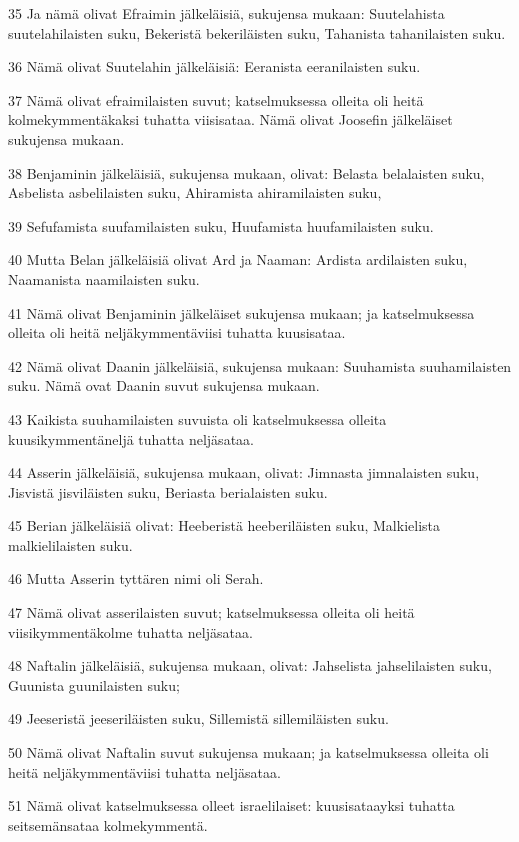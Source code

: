 \par 35 Ja nämä olivat Efraimin jälkeläisiä, sukujensa mukaan: Suutelahista suutelahilaisten suku, Bekeristä bekeriläisten suku, Tahanista tahanilaisten suku.
\par 36 Nämä olivat Suutelahin jälkeläisiä: Eeranista eeranilaisten suku.
\par 37 Nämä olivat efraimilaisten suvut; katselmuksessa olleita oli heitä kolmekymmentäkaksi tuhatta viisisataa. Nämä olivat Joosefin jälkeläiset sukujensa mukaan.
\par 38 Benjaminin jälkeläisiä, sukujensa mukaan, olivat: Belasta belalaisten suku, Asbelista asbelilaisten suku, Ahiramista ahiramilaisten suku,
\par 39 Sefufamista suufamilaisten suku, Huufamista huufamilaisten suku.
\par 40 Mutta Belan jälkeläisiä olivat Ard ja Naaman: Ardista ardilaisten suku, Naamanista naamilaisten suku.
\par 41 Nämä olivat Benjaminin jälkeläiset sukujensa mukaan; ja katselmuksessa olleita oli heitä neljäkymmentäviisi tuhatta kuusisataa.
\par 42 Nämä olivat Daanin jälkeläisiä, sukujensa mukaan: Suuhamista suuhamilaisten suku. Nämä ovat Daanin suvut sukujensa mukaan.
\par 43 Kaikista suuhamilaisten suvuista oli katselmuksessa olleita kuusikymmentäneljä tuhatta neljäsataa.
\par 44 Asserin jälkeläisiä, sukujensa mukaan, olivat: Jimnasta jimnalaisten suku, Jisvistä jisviläisten suku, Beriasta berialaisten suku.
\par 45 Berian jälkeläisiä olivat: Heeberistä heeberiläisten suku, Malkielista malkielilaisten suku.
\par 46 Mutta Asserin tyttären nimi oli Serah.
\par 47 Nämä olivat asserilaisten suvut; katselmuksessa olleita oli heitä viisikymmentäkolme tuhatta neljäsataa.
\par 48 Naftalin jälkeläisiä, sukujensa mukaan, olivat: Jahselista jahselilaisten suku, Guunista guunilaisten suku;
\par 49 Jeeseristä jeeseriläisten suku, Sillemistä sillemiläisten suku.
\par 50 Nämä olivat Naftalin suvut sukujensa mukaan; ja katselmuksessa olleita oli heitä neljäkymmentäviisi tuhatta neljäsataa.
\par 51 Nämä olivat katselmuksessa olleet israelilaiset: kuusisataayksi tuhatta seitsemänsataa kolmekymmentä.
